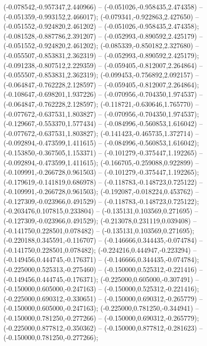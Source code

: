  (-0.078542,-0.957347,2.440966) -- (-0.051026,-0.958435,2.474358) -- (-0.051359,-0.993152,2.466017);
 (-0.079341,-0.922863,2.427650) -- (-0.051552,-0.924820,2.461202) -- (-0.051026,-0.958435,2.474358);
 (-0.081528,-0.887786,2.391207) -- (-0.052993,-0.890592,2.425179) -- (-0.051552,-0.924820,2.461202);
 (-0.085339,-0.850182,2.327680) -- (-0.055507,-0.853831,2.362319) -- (-0.052993,-0.890592,2.425179);
 (-0.091238,-0.807512,2.229359) -- (-0.059405,-0.812007,2.264864) -- (-0.055507,-0.853831,2.362319);
 (-0.099453,-0.756892,2.092157) -- (-0.064847,-0.762228,2.128597) -- (-0.059405,-0.812007,2.264864);
 (-0.108647,-0.698201,1.937226) -- (-0.070956,-0.704350,1.974537) -- (-0.064847,-0.762228,2.128597);
 (-0.118721,-0.630646,1.765770) -- (-0.077672,-0.637531,1.803827) -- (-0.070956,-0.704350,1.974537);
 (-0.129667,-0.553370,1.577434) -- (-0.084996,-0.560853,1.616042) -- (-0.077672,-0.637531,1.803827);
 (-0.141423,-0.465735,1.372714) -- (-0.092894,-0.473599,1.411615) -- (-0.084996,-0.560853,1.616042);
 (-0.153850,-0.367505,1.153371) -- (-0.101279,-0.375447,1.192265) -- (-0.092894,-0.473599,1.411615);
 (-0.166705,-0.259088,0.922899) -- (-0.109991,-0.266728,0.961503) -- (-0.101279,-0.375447,1.192265);
 (-0.179619,-0.141819,0.686978) -- (-0.118783,-0.148723,0.725122) -- (-0.109991,-0.266728,0.961503);
 (-0.192087,-0.018224,0.453762) -- (-0.127309,-0.023966,0.491529) -- (-0.118783,-0.148723,0.725122);
 (-0.203476,0.107815,0.233804) -- (-0.135131,0.103569,0.271695) -- (-0.127309,-0.023966,0.491529);
 (-0.213078,0.231119,0.039408) -- (-0.141750,0.228501,0.078482) -- (-0.135131,0.103569,0.271695);
 (-0.220188,0.345591,-0.116707) -- (-0.146666,0.344435,-0.074784) -- (-0.141750,0.228501,0.078482);
 (-0.224216,0.444947,-0.223294) -- (-0.149456,0.444745,-0.176371) -- (-0.146666,0.344435,-0.074784);
 (-0.225000,0.525313,-0.275460) -- (-0.150000,0.525312,-0.221416) -- (-0.149456,0.444745,-0.176371);
 (-0.225000,0.605000,-0.307491) -- (-0.150000,0.605000,-0.247163) -- (-0.150000,0.525312,-0.221416);
 (-0.225000,0.690312,-0.330651) -- (-0.150000,0.690312,-0.265779) -- (-0.150000,0.605000,-0.247163);
 (-0.225000,0.781250,-0.344941) -- (-0.150000,0.781250,-0.277266) -- (-0.150000,0.690312,-0.265779);
 (-0.225000,0.877812,-0.350362) -- (-0.150000,0.877812,-0.281623) -- (-0.150000,0.781250,-0.277266);
